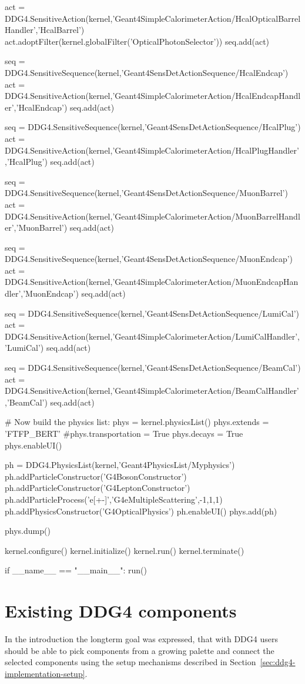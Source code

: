 \documentclass[10pt,a4paper]{article}
\begin{document}
\begin{code}
  act = DDG4.SensitiveAction(kernel,'Geant4SimpleCalorimeterAction/HcalOpticalBarrelHandler','HcalBarrel')
  act.adoptFilter(kernel.globalFilter('OpticalPhotonSelector'))
  seq.add(act)

  seq = DDG4.SensitiveSequence(kernel,'Geant4SensDetActionSequence/HcalEndcap')
  act = DDG4.SensitiveAction(kernel,'Geant4SimpleCalorimeterAction/HcalEndcapHandler','HcalEndcap')
  seq.add(act)

  seq = DDG4.SensitiveSequence(kernel,'Geant4SensDetActionSequence/HcalPlug')
  act = DDG4.SensitiveAction(kernel,'Geant4SimpleCalorimeterAction/HcalPlugHandler','HcalPlug')
  seq.add(act)

  seq = DDG4.SensitiveSequence(kernel,'Geant4SensDetActionSequence/MuonBarrel')
  act = DDG4.SensitiveAction(kernel,'Geant4SimpleCalorimeterAction/MuonBarrelHandler','MuonBarrel')
  seq.add(act)

  seq = DDG4.SensitiveSequence(kernel,'Geant4SensDetActionSequence/MuonEndcap')
  act = DDG4.SensitiveAction(kernel,'Geant4SimpleCalorimeterAction/MuonEndcapHandler','MuonEndcap')
  seq.add(act)

  seq = DDG4.SensitiveSequence(kernel,'Geant4SensDetActionSequence/LumiCal')
  act = DDG4.SensitiveAction(kernel,'Geant4SimpleCalorimeterAction/LumiCalHandler','LumiCal')
  seq.add(act)

  seq = DDG4.SensitiveSequence(kernel,'Geant4SensDetActionSequence/BeamCal')
  act = DDG4.SensitiveAction(kernel,'Geant4SimpleCalorimeterAction/BeamCalHandler','BeamCal')
  seq.add(act)

  # Now build the physics list:
  phys = kernel.physicsList()
  phys.extends = 'FTFP_BERT'
  #phys.transportation = True
  phys.decays  = True
  phys.enableUI()

  ph = DDG4.PhysicsList(kernel,'Geant4PhysicsList/Myphysics')
  ph.addParticleConstructor('G4BosonConstructor')
  ph.addParticleConstructor('G4LeptonConstructor')
  ph.addParticleProcess('e[+-]','G4eMultipleScattering',-1,1,1)
  ph.addPhysicsConstructor('G4OpticalPhysics')
  ph.enableUI()
  phys.add(ph)

  phys.dump()

  kernel.configure()
  kernel.initialize()
  kernel.run()
  kernel.terminate()

if __name__ == "__main__":
  run()

\end{code}

\newpage
\section{Existing DDG4 components}
\noindent
In the introduction the longterm goal was expressed, that with DDG4 users
should be able to pick components from a growing palette and connect the
selected components using the setup mechanisms described in 
Section~\ref{sec:ddg4-implementation-setup}.
\end{document}
